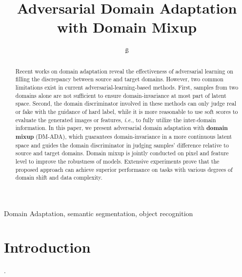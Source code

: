 \documentclass[conference]{IEEEtran}
\begin{document}
\title{Adversarial Domain Adaptation with Domain Mixup}

\author{
ß
}

\maketitle

\begin{abstract}
Recent works on domain adaptation reveal the effectiveness of 
adversarial learning on filling the discrepancy between source and 
target domains. 
However, two common limitations exist in current adversarial-learning-based
methods. 
First, samples from two domains alone are not sufficient to ensure domain-invariance
at most part of latent space.
Second, the domain discriminator involved in these methods can only 
judge real or fake with the guidance of hard label, while it is more 
reasonable to use soft scores to evaluate the generated images or features,
\textit{i.e.}, to fully utilize the inter-domain information.
In this paper, we present adversarial domain adaptation with 
\textbf{domain mixup} (DM-ADA), which guarantees domain-invariance 
in a more continuous latent space and guides the domain discriminator
in judging samples' difference relative to source and target domains.
Domain mixup is jointly conducted on pixel and feature level 
to improve the robustness of models. 
Extensive experiments prove that the proposed approach can achieve 
superior performance on tasks with various degrees of domain shift 
and data complexity.
\end{abstract}

\begin{IEEEkeywords}
Domain Adaptation, semantic segmentation, object recognition
\end{IEEEkeywords}

\section{Introduction}
\cite{b1}.



\end{document}

